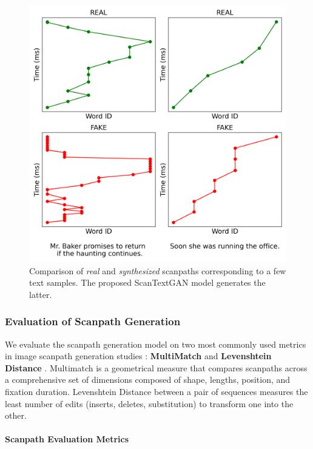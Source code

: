 \begin{figure}[]
    \centering
    \includegraphics[width=0.9\columnwidth]{images/scanpath_plot_combined_sent_5.png}
    \caption{Comparison of \textit{real} and \textit{synthesized} scanpaths corresponding to a few text samples. The proposed ScanTextGAN model generates the latter.}
    \label{fig:scanpath_comparison}
\end{figure}


\subsubsection{Evaluation of Scanpath Generation}
\label{sec:Evaluation of Scanpath Generation}
We evaluate the scanpath generation model on two most commonly used metrics in image scanpath generation studies \cite{sun2019visual,chen2018scanpath,de2022scanpathnet,kummerer2022deepgaze}: \textbf{MultiMatch} \cite{jarodzka2010vector} and \textbf{Levenshtein Distance} \cite{levenshtein1965leveinshtein}. Multimatch is a geometrical measure that compares scanpaths across a comprehensive set of dimensions composed of shape, lengths, position, and fixation duration. Levenshtein Distance between a pair of sequences measures the least number of edits (inserts, deletes, substitution) to transform one into the other.

\paragraph{Scanpath Evaluation Metrics}
\label{sec:appendix_scanpath_metrics}

